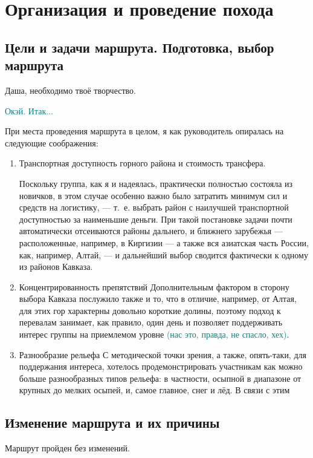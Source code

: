 \section{Организация и проведение похода}
\subsection{Цели и задачи маршрута. Подготовка, выбор маршрута}
Даша, необходимо твоё творчество. 

\textcolor{teal}{Окэй. Итак...} 

При места проведения маршрута в целом, я как руководитель опиралась на следующие соображения: 
\begin{enumerate} 
	\item Транспортная доступность горного района и стоимость трансфера. 

	Поскольку группа, как я и надеялась, практически полностью состояла из новичков, в этом случае особенно важно было затратить минимум сил и средств на логистику, --- т.~е. выбрать район с наилучшей транспортной доступностью за наименьшие деньги. При такой постановке задачи почти автоматически отсеиваются районы дальнего, и ближнего зарубежья --- расположенные, например, в Киргизии --- а также вся азиатская часть России, как, например, Алтай, --- и дальнейший выбор сводится фактически к одному из районов Кавказа. 
	
	\item Концентрированность препятствий 
	Дополнительным фактором в сторону выбора Кавказа послужило также и то, что в отличие, например, от Алтая, для этих гор характерны довольно короткие долины, поэтому подход к перевалам занимает, как правило, один день и позволяет поддерживать интерес группы на приемлемом уровне \textcolor{teal}{(нас это, правда, не спасло, хех)}. 
	
	\item Разнообразие рельефа  
	С методической точки зрения, а также, опять-таки, для поддержания интереса, хотелось продемонстрировать участникам как можно больше разнообразных типов рельефа: в частности, осыпной в диапазоне от крупных до мелких осыпей, и, самое главное, снег и лёд. В связи с этим 
\end{enumerate} 

\subsection{Изменение маршрута и их причины}
Маршрут пройден без изменений.
